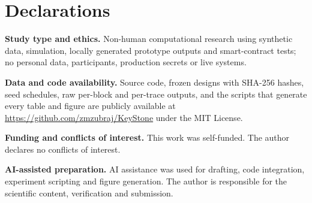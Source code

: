 \documentclass[10pt]{article}
\begin{document}
\section*{Declarations}

\textbf{Study type and ethics.} Non-human computational research using synthetic data, simulation, locally generated prototype outputs and smart-contract tests; no personal data, participants, production secrets or live systems.

\textbf{Data and code availability.} Source code, frozen designs with SHA-256 hashes, seed schedules, raw per-block and per-trace outputs, and the scripts that generate every table and figure are publicly available at \url{https://github.com/zmzubraj/KeyStone} under the MIT License.

\textbf{Funding and conflicts of interest.} This work was self-funded. The author declares no conflicts of interest.

\textbf{AI-assisted preparation.} AI assistance was used for drafting, code integration, experiment scripting and figure generation. The author is responsible for the scientific content, verification and submission.



\end{document}
